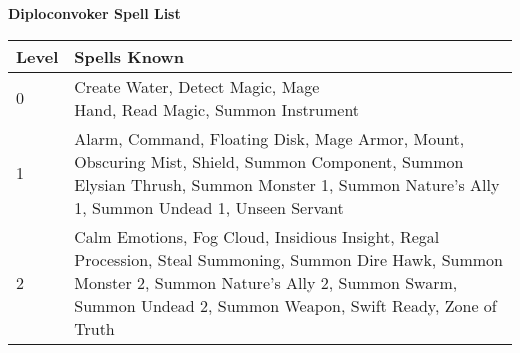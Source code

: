 \textbf{\large{Diploconvoker Spell List}}
\begin{center}
\begin{adjustwidth}{-4cm}{}
\begin{small}
\begin{tabular}{| l | l |}
\hline
Level &Spells Known \\
\hline
0 &\makecell{Create Water, Detect Magic, Mage\\ Hand, Read Magic, Summon Instrument} \\
1 &\makecell{Alarm, Command, Floating Disk, Mage Armor, Mount, Obscuring Mist, Shield, Summon Component, Summon\\ Elysian Thrush, Summon Monster 1, Summon Nature’s Ally 1, Summon Undead 1, Unseen Servant} \\
2 &\makecell{Calm Emotions, Fog Cloud, Insidious Insight, Regal Procession, Steal Summoning, Summon Dire Hawk, Summon\\ Monster 2, Summon Nature’s Ally 2, Summon Swarm, Summon Undead 2, Summon Weapon, Swift Ready, Zone of Truth} \\
\hline
\end{tabular}
\end{small}
\end{adjustwidth}
\end{center}
